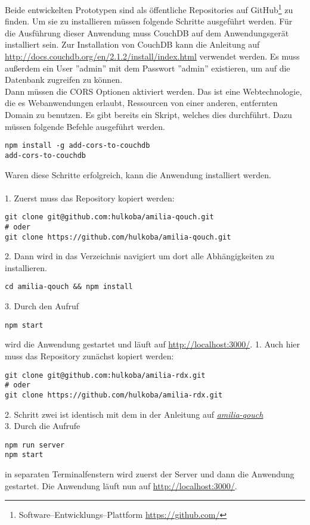 Beide entwickelten Prototypen sind als öffentliche Repositories auf GitHub\footnote{Software--Entwicklungs--Plattform \url{https://github.com/}} zu finden. 
Um sie zu installieren müssen folgende Schritte ausgeführt werden.
%
%
Für die Ausführung dieser Anwendung muss CouchDB auf dem Anwendungsgerät installiert sein.
Zur Installation von CouchDB kann die Anleitung auf \url{http://docs.couchdb.org/en/2.1.2/install/index.html} verwendet werden.
Es muss außerdem ein User ''admin'' mit dem Passwort ''admin'' existieren, um auf die Datenbank zugreifen zu können.\\
Dann müssen die \gls{CORS} Optionen aktiviert werden.
Das ist eine Webtechnologie, die es Webanwendungen erlaubt, Ressourcen von einer anderen, entfernten Domain zu benutzen.
Es gibt bereits ein Skript, welches dies durchführt. Dazu müssen folgende Befehle ausgeführt werden.
%
\begin{lstlisting}
npm install -g add-cors-to-couchdb
add-cors-to-couchdb
\end{lstlisting}
%
Waren diese Schritte erfolgreich, kann die Anwendung installiert werden.\\\\
1. Zuerst muss das Repository kopiert werden:
\begin{lstlisting}
git clone git@github.com:hulkoba/amilia-qouch.git
# oder
git clone https://github.com/hulkoba/amilia-qouch.git
\end{lstlisting}
2. Dann wird in das Verzeichnis navigiert um dort alle Abhängigkeiten zu installieren.
\begin{lstlisting}
cd amilia-qouch && npm install
\end{lstlisting}
3. Durch den Aufruf
\begin{lstlisting}
npm start
\end{lstlisting}
wird die Anwendung gestartet und läuft auf \url{http://localhost:3000/}.
%
%
%
1. Auch hier muss das Repository zunächst kopiert werden:
\begin{lstlisting}
git clone git@github.com:hulkoba/amilia-rdx.git
# oder
git clone https://github.com/hulkoba/amilia-rdx.git
\end{lstlisting}
2. Schritt zwei ist identisch mit dem in der Anleitung auf \hyperref[chap:install:qouch]{\it{amilia-qouch}}\\
3. Durch die Aufrufe
\begin{lstlisting}
npm run server
npm start
\end{lstlisting}
in separaten Terminalfenstern wird zuerst der Server und dann die Anwendung gestartet.
Die Anwendung läuft nun auf \url{http://localhost:3000/}.